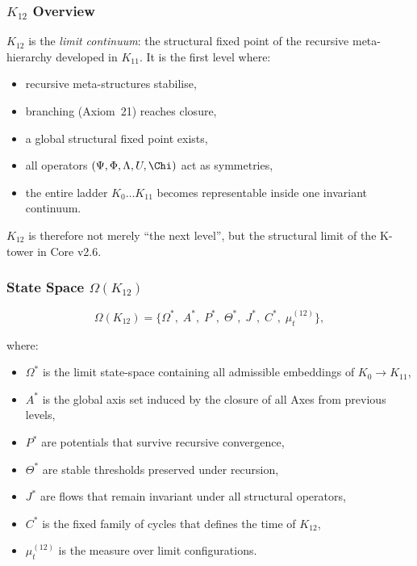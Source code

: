 

\subsubsection{$K_{12}$ Overview}
\label{sec:k12-overview}

$K_{12}$ is the \emph{limit continuum}: the structural fixed point of the
recursive meta-hierarchy developed in $K_{11}$.
It is the first level where:

\begin{itemize}
    \item recursive meta-structures stabilise,
    \item branching (Axiom~21) reaches closure,
    \item a global structural fixed point exists,
    \item all operators $(\Psi,\Phi,\Lambda,U,\Chi)$ act as symmetries,
    \item the entire ladder $K_0\dots K_{11}$ becomes representable inside one
          invariant continuum.
\end{itemize}

$K_{12}$ is therefore not merely “the next level”, but the structural limit of
the K-tower in Core v2.6.

\subsubsection{State Space $\Omega(K_{12})$}

\[
\Omega(K_{12}) =
\{
\Omega^*,\;
A^*,\;
P^*,\;
\Theta^*,\;
J^*,\;
C^*,\;
\mu^{(12)}_t
\},
\]

where:
\begin{itemize}
    \item $\Omega^*$ is the limit state-space containing all admissible embeddings
          of $K_0\!\to\!K_{11}$,
    \item $A^*$ is the global axis set induced by the closure of all Axes
          from previous levels,
    \item $P^*$ are potentials that survive recursive convergence,
    \item $\Theta^*$ are stable thresholds preserved under recursion,
    \item $J^*$ are flows that remain invariant under all structural operators,
    \item $C^*$ is the fixed family of cycles that defines the time of $K_{12}$,
    \item $\mu^{(12)}_t$ is the measure over limit configurations.
\end{itemize}

